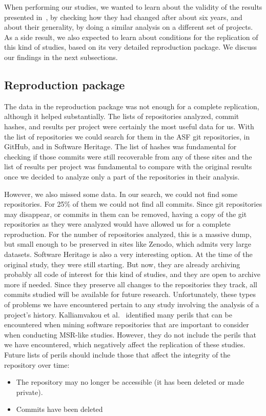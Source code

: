 When performing our studies, we wanted to learn about the validity of the results presented in~\cite{tufano2017there}, by checking how they had changed after about six years, and about their generality, by doing a similar analysis on a different set of projects. As a side result, we also expected to learn about conditions for the replication of this kind of studies, based on its very detailed reproduction package. We discuss our findings in the next subsections.

\subsection{Reproduction package}

The data in the reproduction package was not enough for a complete replication, although it helped substantially. The lists of repositories analyzed, commit hashes, and results per project were certainly the most useful data for us. With the list of repositories we could search for them in the ASF git repositories, in GitHub, and in Software Heritage. The list of hashes was fundamental for checking if those commits were still recoverable from any of these sites and the list of results per project was fundamental to compare with the original results once we decided to analyze only a part of the repositories in their analysis.

However, we also missed some data. In our search, we could not find some repositories. For 25\% of them we could not find all commits. Since git repositories may disappear, or commits in them can be removed, having a copy of the git repositories as they were analyzed would have allowed us for a complete reproduction. For the number of repositories analyzed, this is a massive dump, but small enough to be preserved in sites like Zenodo, which admits very large datasets. Software Heritage is also a very interesting option. At the time of the original study, they were still starting. But now, they are already archiving probably all code of interest for this kind of studies, and they are open to archive more if needed. Since they preserve all changes to the repositories they track, all commits studied will be available for future research.
Unfortunately, these types of problems we have encountered pertain to any study involving the analysis of a project's history. Kalliamvakou et al.~\cite{kalliamvakou2016depth} identified many perils that can be encountered when mining software repositories that are important to consider when conducting MSR-like studies. 
However, they do not include the perils that we have encountered, which negatively affect the replication of these studies. 
Future lists of perils should include those that affect the integrity of the repository over time:
\begin{itemize}
    \item The repository may no longer be accessible (it has been deleted or made private).
    \item Commits have been deleted
\end{itemize}

